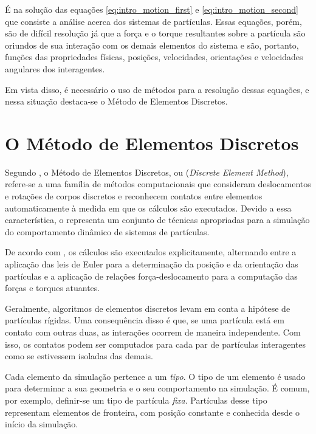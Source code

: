 É na solução das equações \eqref{eq:intro_motion_first} e \eqref{eq:intro_motion_second} que consiste a análise acerca dos sistemas de partículas. Essas equações, porém, são de difícil resolução já que a força e o torque resultantes sobre a partícula são oriundos de sua interação com os demais elementos do sistema e são, portanto, funções das propriedades físicas, posições, velocidades, orientações e velocidades angulares dos interagentes.

Em vista disso, é necessário o uso de métodos para a resolução dessas equações, e nessa situação destaca-se o Método de Elementos Discretos.

\section{O Método de Elementos Discretos} 

Segundo , o Método de Elementos Discretos, ou \DEM{} (\textit{Discrete Element Method}), refere-se a uma família de métodos computacionais que consideram deslocamentos e rotações de corpos discretos e reconhecem contatos entre elementos automaticamente à medida em que os cálculos são executados. Devido a essa característica, o \DEM{} representa um conjunto de técnicas apropriadas para a simulação do comportamento dinâmico de sistemas de partículas.

De acordo com , os cálculos são executados explicitamente, alternando entre a aplicação das leis de Euler para a determinação da posição e da orientação das partículas e a aplicação de relações força-deslocamento para a computação das forças e torques atuantes.

Geralmente, algoritmos de elementos discretos levam em conta a hipótese de partículas rígidas. Uma consequência disso é que, se uma partícula está em contato com outras duas, as interações ocorrem de maneira independente. Com isso, os contatos podem ser computados para cada par de partículas interagentes como se estivessem isoladas das demais.

Cada elemento da simulação pertence a um \textit{tipo}. O tipo de um elemento é usado para determinar a sua geometria e o seu comportamento na simulação. É comum, por exemplo, definir-se um tipo de partícula \textit{fixa}. Partículas desse tipo representam elementos de fronteira, com posição constante e conhecida desde o início da simulação.


